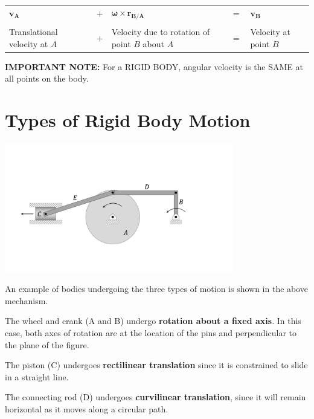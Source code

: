 \documentclass[12pt,letterpaper,twoside]{report}
\begin{document}
\vspace*{10\baselineskip}

\begin{center}
\begin{tabu} to 1\textwidth {  X[c]  X[c] X[c] X[c]  X[c]  }
$\bm{v_A}$ & $+$ & $\bm{\omega} \times \bm{r_{B/A}}$ & $=$ & $\bm{v_B}$\\
 & & & & \\
Translational velocity at $A$ & $+$ & Velocity due to rotation of point $B$ about $A$ & $=$ & Velocity at point $B$\\

\end{tabu}
\end{center}

\textbf{IMPORTANT NOTE:} For a RIGID BODY, angular velocity is the SAME at all points on the body. 


\section{Types of Rigid Body Motion}

\begin{center}
\includegraphics[trim={2cm 4cm 5cm 5.5cm},clip,width=0.75\textwidth]{Slide2}
\end{center}


An example of bodies undergoing the three types of motion is shown in the above mechanism.

The wheel and crank (A and B) undergo \textbf{rotation about a fixed axis}.  In this case, both axes of rotation are at the location of the pins and perpendicular to the plane of the figure.

The piston (C) undergoes \textbf{rectilinear translation} since it is constrained to slide in a straight line.  

The connecting rod (D) undergoes \textbf{curvilinear translation}, since it will remain horizontal as it moves along a circular path.
\end{document}
